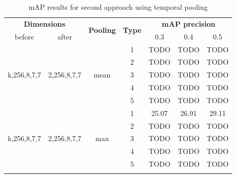 \documentclass{report}
\begin{document}
\begin{center}
\begin{longtable}{||c | c| c| c||c c c||}

  \hline
 \multicolumn{2}{||c|}{\textbf{Dimensions}} & \multirow{2}{*}{\textbf{Pooling}} &\multirow{2}{*}{ \textbf{Type}} &\multicolumn{3}{|c||}{\textbf{mAP precision}}\\

  before & after & {} & {} & 0.3 &  0.4 & 0.5 \\
  \hline   \hline

  \multirow{5}{*}{k,256,8,7,7} & \multirow{5}{*}{2,256,8,7,7} & \multirow{5}{*}{mean}  & 1 & TODO & TODO & TODO \\
  \cline{4-7}

  {} & {} & {} & 2 & TODO & TODO & TODO \\
  \cline{4-7}
  {} & {} & {} & 3 & TODO & TODO & TODO \\
  \cline{4-7}
  {} & {} & {} & 4 & TODO & TODO & TODO \\
  \cline{4-7}
  {} & {} & {} & 5 & TODO & TODO & TODO \\
  \hline

  \multirow{5}{*}{k,256,8,7,7} & \multirow{5}{*}{2,256,8,7,7} & \multirow{5}{*}{max}  & 1 & 25.07 & 26.91 & 29.11 \\
  \cline{4-7}

  {} & {} & {} & 2 & TODO & TODO & TODO \\
  \cline{4-7}
  {} & {} & {} & 3 & TODO & TODO & TODO \\
  \cline{4-7}
  {} & {} & {} & 4 & TODO & TODO & TODO \\
  \cline{4-7}
  {} & {} & {} & 5 & TODO & TODO & TODO \\
  \hline



  \caption{mAP results for second approach using temporal pooling }
  \label{table:svm_temp_pooling}
\end{longtable} 
\end{center}
\end{document}

